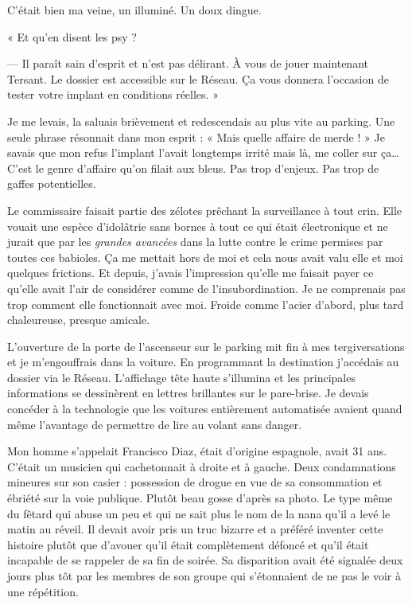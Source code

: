 C'était bien ma veine, un illuminé. Un doux dingue.

« Et qu'en disent les psy ?

— Il paraît sain d'esprit et n'est pas délirant. À vous de jouer maintenant Tersant. Le dossier est accessible sur le
Réseau. Ça vous donnera l'occasion de tester votre implant en conditions réelles. »

Je me levais, la saluais brièvement et redescendais au plus vite au parking. Une seule phrase résonnait dans mon
esprit : « Mais quelle affaire de merde ! » Je savais que mon refus l'implant l'avait longtemps irrité mais là, me 
coller sur ça… C'est le genre d'affaire qu'on filait aux bleus. Pas trop d'enjeux. Pas trop de gaffes potentielles.

Le commissaire faisait partie des zélotes prêchant la surveillance à tout crin. Elle vouait une espèce d'idolâtrie sans
bornes à tout ce qui était électronique et ne jurait que par les \emph{grandes avancées} dans la lutte contre le crime
permises par toutes ces babioles. Ça me mettait hors de moi et cela nous avait valu elle et moi quelques frictions. Et
depuis, j'avais l'impression qu'elle me faisait payer ce qu'elle avait l'air de considérer comme de l'insubordination. 
Je ne comprenais pas trop comment elle fonctionnait avec moi. Froide comme l'acier d'abord, plus tard chaleureuse, 
presque amicale.

L'ouverture de la porte de l'ascenseur sur le parking mit fin à mes tergiversations et je m'engouffrais dans la
voiture. En programmant la destination j'accédais au dossier via le Réseau. L'affichage tête haute s'illumina et les
principales informations se dessinèrent en lettres brillantes sur le pare-brise. Je devais concéder à la technologie
que les voitures entièrement automatisée avaient quand même l'avantage de permettre de lire au volant sans danger.

Mon homme s'appelait Francisco Diaz, était d'origine espagnole, avait 31 ans. C'était un musicien qui cachetonnait à
droite et à gauche. Deux condamnations mineures sur son casier : possession de drogue en vue de sa consommation et
ébriété sur la voie publique. Plutôt beau gosse d'après sa photo. Le type même du fêtard qui abuse un peu et qui ne sait
plus le nom de la nana qu'il a levé le matin au réveil. Il devait avoir pris un truc bizarre et a préféré inventer cette
histoire plutôt que d'avouer qu'il était complètement défoncé et qu'il était incapable de se rappeler de sa fin de 
soirée. Sa disparition avait été signalée deux jours plus tôt par les membres de son groupe qui s'étonnaient de ne pas 
le voir à une répétition.

